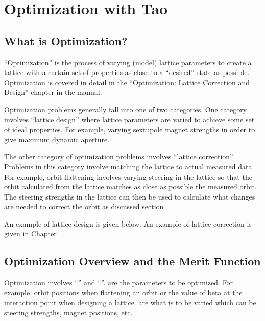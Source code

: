 \documentclass{hitec}     %
\newcommand{\Section}[1]{\section{#1}\vspace*{-1ex}}
\begin{document}
\newpage

\Section{Optimization with Tao}
\label{s:optimization}

\subsection{What is Optimization?}
\label{s:opt.what}

``Optimization'' is the process of varying (model) lattice parameters to create a lattice with a
certain set of properties as close to a ``desired'' state as possible. Optimization is covered in
detail in the ``Optimization: Lattice Correction and Design'' chapter in the \tao manual.

Optimization problems generally fall into one of two categories. One category involves ``lattice
design'' where lattice parameters are varied to achieve some set of ideal properties. For example,
varying sextupole magnet strengths in order to give maximum dynamic aperture.

The other category of optimization problems involves ``lattice correction''. Problems in this
category involve matching the  lattice to actual measured data.  For example, orbit
flattening involves varying steering in the  lattice so that the orbit calculated from the
 lattice matches as close as possible the measured orbit. The steering strengths in the
 lattice can then be used to calculate what changes are needed to correct the orbit
as discussed section~. 

An example of lattice design is given below. An example of lattice correction is given in
Chapter~.

\subsection{Optimization Overview and the Merit Function}
\label{s:opt.overview}

Optimization involves ``'' and ``''.  are the parameters to be
optimized.  For example, orbit positions when flattening an orbit or the value of beta at the
interaction point when designing a lattice.  are what is to be varied which can be
steering strengths, magnet positions, etc. 
\end{document}
